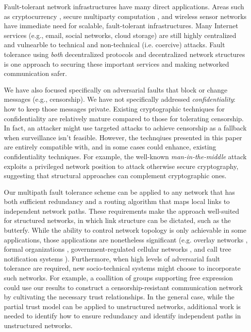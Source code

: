 \documentclass{sig-alternate-05-2015}
\begin{document}
Fault-tolerant network infrastructures have many direct applications.
Areas such as cryptocurrency
\cite{mazieres_stellar_2015,nakamoto_bitcoin:_2008,king_ppcoin:_2012},
secure multiparty computation
\cite{yao_protocols_1982,chaum_multiparty_1988,goldreich_how_1987},
and wireless sensor networks
\cite{khiani_comparative_2013}
have immediate need for scalable, fault-tolerant infrastructures.
Many Internet services (e.g., email, social networks, cloud storage)
are still highly centralized and vulnearble to technical and
non-technical (i.e. coercive) attacks.
Fault tolerance using {\em both} decentralized protocols and
decentralized network structures
is one approach to securing these important
services and making networked communication safer.

We have also focused specifically on adversarial faults that block or
change messages (e.g., censorship).
We have not specifically addressed {\em confidentiality}:
how to keep those messages private.
Existing cryptographic techniques for confidentiality are relatively
mature compared to those for tolerating censorship.
In fact, an attacker might use targeted attacks to achieve censorship
as a fallback when surveillance isn't feasible.
However, the technqiues presented in this paper
are entirely compatible with, and in some cases could enhance, existing
confidentiality techniques.
For example, the well-known {\em man-in-the-middle} attack exploits a privileged
network position to attack otherwise secure cryptography,
suggesting that structural approaches can complement cryptographic ones.

Our multipath fault tolerance scheme can be applied to any network
that has both sufficient redundancy and a routing algorithm
that maps local links to independent network paths.
These requirements make the approach well-suited for structured networks,
in which link structure can be dictated,
such as the butterfy.
While the ability to control network topology is only achievable in some
applications, those applications are nonetheless significant
(e.g. overlay networks \cite{lua_survey_2005, korzun_structured_2013},
formal organizations \cite{mohr_explaining_1982},
government-regulated cellular networks \cite{walker_mass_2012},
and call tree notification systems \cite{nickerson_thinking_2010}).
Furthermore, when high levels of adversarial fault tolerance are required,
new socio-technical systems might choose to incorporate such networks.
For example,
a coallition of groups supporting free expression could use our results
to construct a censorship-resistant communication network
by cultivating the necessary trust relationships.
In the general case,
while the partial trust model can be applied to unstructured networks,
additional work is needed to identify how to ensure redundancy and
identify independent paths in unstructured networks.
\end{document}
